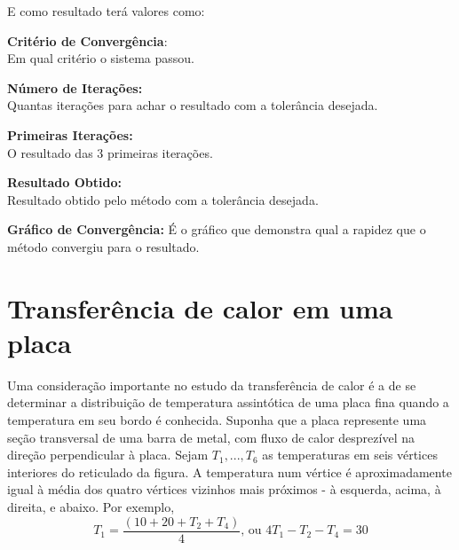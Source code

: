 \documentclass[
12pt,				%
openright,			%
twoside,			%
a4paper,			%
english,			%
french,				%
spanish,			%
brazil				%
]{abntex2_new}
\begin{document}
		E como resultado terá valores como:\\
		\begin{alineas}
			
			\item{\textbf{Critério de Convergência}:\\
				Em qual critério o sistema passou.}
			\item{\textbf{Número de Iterações:}\\
				Quantas iterações para achar o resultado com a tolerância desejada.}
			\item{\textbf{Primeiras Iterações:}\\
				O resultado das 3 primeiras iterações.}
			\item{\textbf{Resultado Obtido:}\\
				Resultado obtido pelo método com a tolerância desejada.
			}
			\item{\textbf{Gráfico de Convergência:}
				É o gráfico que demonstra qual a rapidez que o método convergiu para o
				resultado.
			}
		\end{alineas}
		
		
		\section{Transferência de calor em uma placa}
		Uma consideração importante no estudo da transferência de calor é a de
		se determinar a distribuição de temperatura assintótica de uma placa
		fina quando a temperatura em seu bordo é conhecida. Suponha que a placa
		represente uma seção transversal de uma barra de metal, com
		fluxo de calor desprezível na direção perpendicular à placa. Sejam
		$T_{1},..., T_6$ as temperaturas em seis vértices interiores do reticulado
		da figura. A temperatura num vértice é aproximadamente igual à média
		dos quatro vértices vizinhos mais próximos - à esquerda, acima, à direita,
		e abaixo. Por exemplo,\\
		
		$$T_1 = \frac{(10+20+T_2+T_4)}{4} \text{, ou } 4 T_1 - T_2 - T_4 = 30$$\\
		
\end{document}
